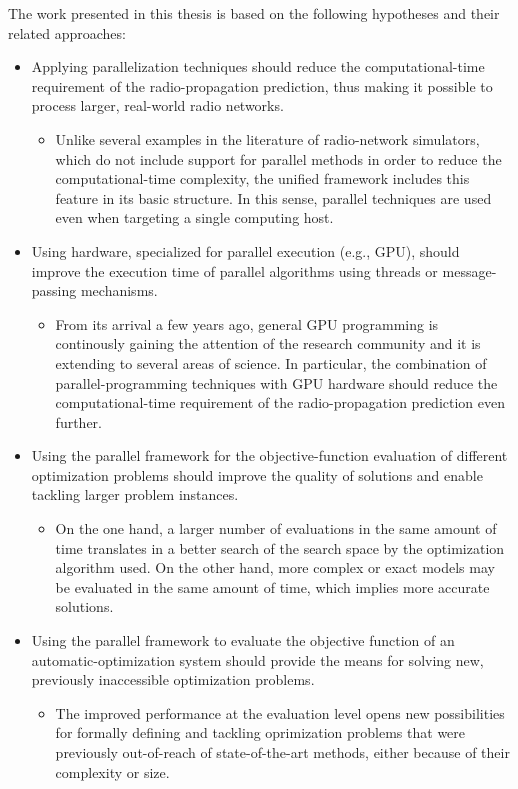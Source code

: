 The work presented in this thesis is based on the following hypotheses
and their related approaches:
\begin{itemize}
\item Applying parallelization techniques should reduce the computational-time
requirement of the radio-propagation prediction, thus making it possible
to process larger, real-world radio networks.

\begin{itemize}
\item Unlike several examples in the literature of radio-network simulators,
which do not include support for parallel methods in order to reduce
the computational-time complexity, the unified framework includes
this feature in its basic structure. In this sense, parallel techniques
are used even when targeting a single computing host.
\end{itemize}
\item Using hardware, specialized for parallel execution (e.g., GPU), should
improve the execution time of parallel algorithms using threads or
message-passing mechanisms.

\begin{itemize}
\item From its arrival a few years ago, general GPU programming is continously
gaining the attention of the research community and it is extending
to several areas of science. In particular, the combination of parallel-programming
techniques with GPU hardware should reduce the computational-time
requirement of the radio-propagation prediction even further.
\end{itemize}
\item Using the parallel framework for the objective-function evaluation
of different optimization problems should improve the quality of solutions
and enable tackling larger problem instances.

\begin{itemize}
\item On the one hand, a larger number of evaluations in the same amount
of time translates in a better search of the search space by the optimization
algorithm used. On the other hand, more complex or exact models may
be evaluated in the same amount of time, which implies more accurate
solutions.
\end{itemize}
\item Using the parallel framework to evaluate the objective function of
an automatic-optimization system should provide the means for solving
new, previously inaccessible optimization problems.

\begin{itemize}
\item The improved performance at the evaluation level opens new possibilities
for formally defining and tackling oprimization problems that were
previously out-of-reach of state-of-the-art methods, either because
of their complexity or size.
\end{itemize}
\end{itemize}

